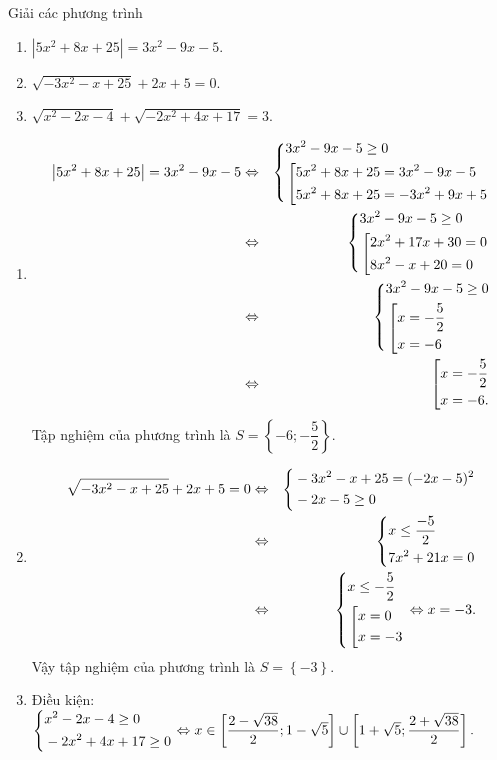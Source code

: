 \begin{bt}%
	Giải các phương trình
	\begin{multicols}{2}
		\begin{enumerate}
			\item $\left|5x^2+8x+25\right|=3x^2-9x-5$.
			\item $\sqrt{-3x^2-x+25}+2x+5=0$.
			\item $\sqrt{x^2-2x-4}+\sqrt{-2x^2+4x+17}=3$.
		\end{enumerate}
	\end{multicols}
	\loigiai
	{
		\begin{enumerate}
			\item 
			\begin{eqnarray*}
				\left|5x^2+8x+25\right|=3x^2-9x-5&\Leftrightarrow& \left\{\begin{aligned}&3x^2-9x-5\ge 0\\&\left[\begin{aligned}&5x^2+8x+25=3x^2-9x-5\\&5x^2+8x+25=-3x^2+9x+5\end{aligned}\right.\end{aligned}\right.\\
				&\Leftrightarrow & \left\{\begin{aligned}&3x^2-9x-5\ge 0\\&\left[\begin{aligned}&2x^2+17x+30=0\\&8x^2-x+20=0\end{aligned}\right.\end{aligned}\right.\\
				&\Leftrightarrow & \left\{\begin{aligned}&3x^2-9x-5\ge 0\\&\left[\begin{aligned}&x=-\dfrac{5}{2}\\&x=-6\end{aligned}\right.\end{aligned}\right.\\
				&\Leftrightarrow & \left[\begin{aligned}&x=-\dfrac{5}{2}\\&x=-6.\end{aligned}\right. 
			\end{eqnarray*}
			Tập nghiệm của phương trình là $S=\left\{-6;-\dfrac{5}{2}\right\}$.
			\item 
			\begin{eqnarray*}
				\sqrt{-3x^2-x+25}+2x+5=0 &\Leftrightarrow & \left\{\begin{aligned}&-3x^2-x+25=(-2x-5)^2\\&-2x-5\ge 0\end{aligned}\right.\\
				&\Leftrightarrow &\left\{\begin{aligned}&x\le \dfrac{-5}{2}\\&7x^2+21x=0\end{aligned}\right.\\
				&\Leftrightarrow &\left\{\begin{aligned}&x\le -\dfrac{5}{2}\\&\left[\begin{aligned}&x=0\\&x=-3\end{aligned}\right.\end{aligned}\right. \Leftrightarrow x=-3. 
			\end{eqnarray*}
			Vậy tập nghiệm của phương trình là $S=\left\{-3\right\}.$
			\item Điều kiện: $\left\{\begin{aligned}&x^2-2x-4\ge 0\\&-2x^2+4x+17\ge 0\end{aligned}\right.\Leftrightarrow x\in \left[\dfrac{2-\sqrt{38}}{2};1-\sqrt{5}\right]\cup \left[1+\sqrt{5};\dfrac{2+\sqrt{38}}{2}\right].$\\

\end{enumerate}}
\end{bt}
